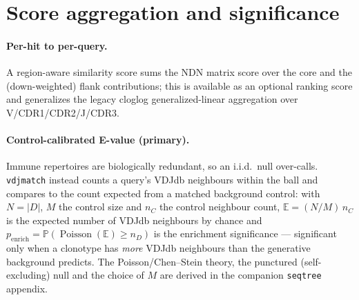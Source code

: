 \documentclass[11pt]{article}
\theoremstyle{oldplain}
\theoremstyle{oldrem}
\DeclareMathOperator{\Poisson}{Poisson}
\newcommand{\E}{\mathbb{E}}
\newcommand{\Prob}{\mathbb{P}}
\begin{document}
\section{Score aggregation and significance}\label{sec:agg}
\paragraph{Per-hit to per-query.} A region-aware similarity score sums the NDN matrix score over the
core and the (down-weighted) flank contributions; this is available as an optional ranking score and
generalizes the legacy cloglog generalized-linear aggregation over V/CDR1/CDR2/J/CDR3.

\paragraph{Control-calibrated E-value (primary).} Immune repertoires are biologically redundant, so an
i.i.d.\ null over-calls. \texttt{vdjmatch} instead counts a query's VDJdb neighbours within the ball
and compares to the count expected from a matched background control: with $N=|D|$, $M$ the control
size and $n_C$ the control neighbour count, $\E=(N/M)\,n_C$ is the expected number of VDJdb neighbours
by chance and $p_{\mathrm{enrich}}=\Prob(\Poisson(\E)\ge n_{D})$ is the enrichment significance ---
significant only when a clonotype has \emph{more} VDJdb neighbours than the generative background
predicts. The Poisson/Chen--Stein theory, the punctured (self-excluding) null and the choice of $M$ are
derived in the companion \texttt{seqtree} appendix.
\end{document}
